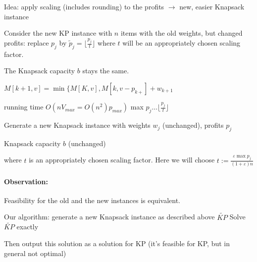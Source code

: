 \documentclass[11pt]{article}
\theoremstyle{definition}
\theoremstyle{definition}
\begin{document}
Idea: apply scaling (includes rounding) to the profits $ \rightarrow $ new, easier Knapsack instance

Consider the new KP instance with $ n $ items with the old weights, but changed profits: replace $ p_ j $ by $ \tilde p_j = \lfloor \frac{p_j}{t} \rfloor $ where $ t $ will be an appropriately chosen scaling factor.

The Knapsack capacity $ b $ stays the same. %




$ M[k + 1, v] = \min \{ M[K, v], M[k, v - p_{k + }] + w_{k + 1} $

running time $ O(n V_{max} = O(n^2) p_{max})$ max $ p_j  \dots \lfloor \frac{p_j}{t} \rfloor $

Generate a new Knapsack instance with weights $ w_j $ (unchanged), profits $ p_j $ 

Knapsack capacity $ b $ (unchanged)

where $ t $ is an appropriately chosen scaling factor. Here we will choose $ t := \frac{\varepsilon \max p_j}{(1 + \varepsilon) n} $

\paragraph{Observation:} Feasibility for the old and the new instances is equivalent.

Our algorithm: generate a new Knapsack instance as described above $ \tilde{KP} $ Solve $ \tilde{KP} $ exactly \newline

Then output this solution as a solution for KP (it's feasible for KP, but in general not optimal)
\end{document}
